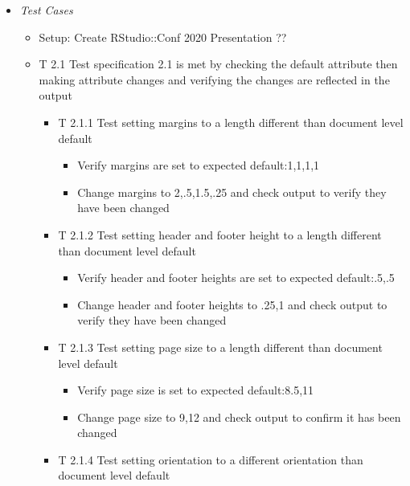 \documentclass[]{article}
\providecommand{\tightlist}{%
  \setlength{\itemsep}{0pt}\setlength{\parskip}{0pt}}
\begin{document}
\begin{itemize}
\item
  \emph{Test Cases}

  \begin{itemize}
  \item
    Setup: Create RStudio::Conf 2020 Presentation ??
  \item
    T 2.1 Test specification 2.1 is met by checking the default
    attribute then making attribute changes and verifying the changes
    are reflected in the output

    \begin{itemize}
    \tightlist
    \item
      T 2.1.1 Test setting margins to a length different than document
      level default

      \begin{itemize}
      \tightlist
      \item
        Verify margins are set to expected default:1,1,1,1
      \item
        Change margins to 2,.5,1.5,.25 and check output to verify they
        have been changed
      \end{itemize}
    \item
      T 2.1.2 Test setting header and footer height to a length
      different than document level default

      \begin{itemize}
      \tightlist
      \item
        Verify header and footer heights are set to expected
        default:.5,.5
      \item
        Change header and footer heights to .25,1 and check output to
        verify they have been changed
      \end{itemize}
    \item
      T 2.1.3 Test setting page size to a length different than document
      level default

      \begin{itemize}
      \tightlist
      \item
        Verify page size is set to expected default:8.5,11
      \item
        Change page size to 9,12 and check output to confirm it has been
        changed
      \end{itemize}
    \item
      T 2.1.4 Test setting orientation to a different orientation than
      document level default


\end{itemize}
\end{itemize}
\end{itemize}
\end{document}
